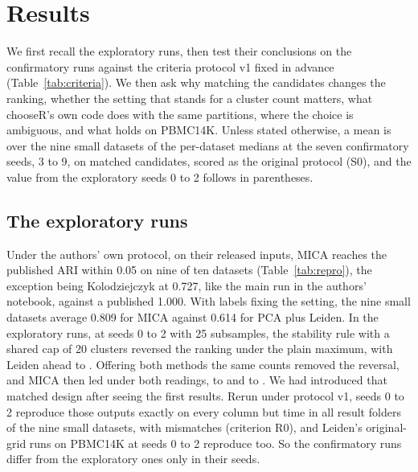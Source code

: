 \section{Results}\label{sec:results}
We first recall the exploratory runs, then test their conclusions on the confirmatory
runs against the criteria protocol v1 fixed in advance (Table~\ref{tab:criteria}). We then ask why
matching the candidates changes the ranking, whether the setting that stands for a cluster count matters,
what chooseR's own code does with the same partitions, where the choice is ambiguous, and what holds on
PBMC14K. Unless stated otherwise, a mean is over the nine small datasets of the per-dataset medians at the
seven confirmatory seeds, 3 to 9, on matched candidates, scored as the original protocol (S0), and the
value from the exploratory seeds 0 to 2 follows in parentheses.



\subsection{The exploratory runs}
Under the authors' own protocol, on their released inputs, MICA reaches the published ARI within 0.05 on nine of ten datasets (Table~\ref{tab:repro}), the exception being Kolodziejczyk at 0.727, like the main run in the authors' notebook,
against a published 1.000. With labels fixing the setting, the nine small datasets average 0.809 for MICA
against 0.614 for PCA plus Leiden. In the exploratory runs, at seeds 0 to 2 with 25 subsamples, the stability rule
with a shared cap of 20 clusters reversed the ranking under the plain maximum, with Leiden ahead  to
. Offering both methods the same counts removed the reversal, and MICA then led under both readings,
 to  and  to . We had introduced that matched design after seeing the first results.
Rerun under protocol v1, seeds 0 to 2 reproduce those outputs exactly on every column but time in all
 result folders of the nine small datasets, with  mismatches
(criterion R0), and Leiden's original-grid runs on PBMC14K at seeds 0 to 2 reproduce too. So the confirmatory runs differ from the
exploratory ones only in their seeds.



